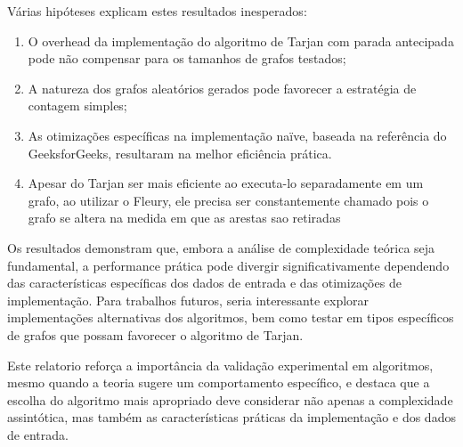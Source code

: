 \documentclass[12pt]{article}
\begin{document}
Várias hipóteses explicam estes resultados inesperados:
\begin{enumerate}
    \item O overhead da implementação do algoritmo de Tarjan com parada antecipada pode não compensar para os tamanhos de grafos testados;
    \item A natureza dos grafos aleatórios gerados pode favorecer a estratégia de contagem simples;
    \item As otimizações específicas na implementação naïve, baseada na referência do GeeksforGeeks, resultaram na melhor eficiência prática.
    \item Apesar do Tarjan ser mais eficiente ao executa-lo separadamente em um grafo, ao utilizar o Fleury, ele precisa ser constantemente chamado pois o grafo se altera na medida em que as arestas sao retiradas
\end{enumerate}

Os resultados demonstram que, embora a análise de complexidade teórica seja fundamental, a performance prática pode divergir significativamente dependendo das características específicas dos dados de entrada e das otimizações de implementação. Para trabalhos futuros, seria interessante explorar implementações alternativas dos algoritmos, bem como testar em tipos específicos de grafos que possam favorecer o algoritmo de Tarjan.

Este relatorio reforça a importância da validação experimental em algoritmos, mesmo quando a teoria sugere um comportamento específico, e destaca que a escolha do algoritmo mais apropriado deve considerar não apenas a complexidade assintótica, mas também as características práticas da implementação e dos dados de entrada.

\nocite{*}


\end{document}
